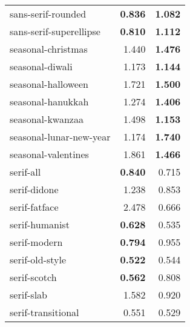 \begin{longtable}{|l|r|r|}
sans-serif-rounded        & \textbf{0.836}          & \textbf{1.082}      \\
sans-serif-superellipse   & \textbf{0.810}          & \textbf{1.112}      \\
seasonal-christmas        & 1.440                   & \textbf{1.476}      \\
seasonal-diwali           & 1.173                   & \textbf{1.144}      \\
seasonal-halloween        & 1.721                   & \textbf{1.500}      \\
seasonal-hanukkah         & 1.274                   & \textbf{1.406}      \\
seasonal-kwanzaa          & 1.498                   & \textbf{1.153}      \\
seasonal-lunar-new-year   & 1.174                   & \textbf{1.740}      \\
seasonal-valentines       & 1.861                   & \textbf{1.466}      \\
serif-all                 & \textbf{0.840}          & 0.715               \\
serif-didone              & 1.238                   & 0.853               \\
serif-fatface             & 2.478                   & 0.666               \\
serif-humanist            & \textbf{0.628}          & 0.535               \\
serif-modern              & \textbf{0.794}          & 0.955               \\
serif-old-style           & \textbf{0.522}          & 0.544               \\
serif-scotch              & \textbf{0.562}          & 0.808               \\
serif-slab                & 1.582                   & 0.920               \\
serif-transitional        & 0.551                   & 0.529         \\           

\end{longtable}


